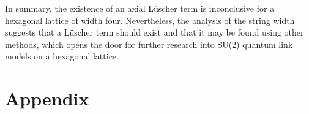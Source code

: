 \documentclass[a4paper,oneside, 11pt,english,listof=totoc,bibliography=totoc]{scrbook}
\begin{document}
In summary, the existence of an axial L\"uscher term is inconclusive for a hexagonal lattice of width four. Nevertheless, the analysis of the string width suggests that a L\"uscher term should exist and that it may be found using other methods, which opens the door for further research into SU(2) quantum link models on a hexagonal lattice.

\printbibliography

\chapter*{Appendix}



































\end{document}
